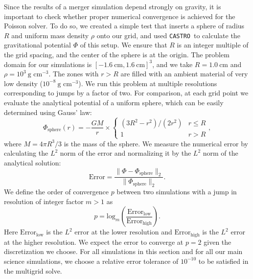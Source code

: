 \documentclass[iop]{../emulateapj}
\newcommand{\castro}{\texttt{CASTRO}}
\begin{document}
Since the results of a merger simulation depend strongly on gravity,
it is important to check whether proper numerical convergence is
achieved for the Poisson solver. To do so, we created a simple test
that inserts a sphere of radius $R$ and uniform mass density $\rho$
onto our grid, and used \castro\ to calculate the gravitational
potential $\Phi$ of this setup. We ensure that $R$ is an integer
multiple of the grid spacing, and the center of the sphere is at the
origin. The problem domain for our simulations is $[-1.6\ \text{cm}, 1.6\ \text{cm}]^3$, and
we take $R = 1.0\ \text{cm}$ and $\rho = 10^3\ \text{g cm}^{-3}$. 
The zones with $r > R$ are filled with an ambient material of very low density 
($10^{-8}\ \text{g cm}^{-3}$). We run this problem at multiple 
resolutions corresponding to jumps by a factor of two. For
comparison, at each grid point we evaluate the analytical potential of
a uniform sphere, which can be easily determined using Gauss' law:
\begin{equation}
  \Phi_{\text{sphere}}(r) = -\frac{GM}{r} \times \begin{cases} (3R^2 - r^2)/(2 r^2) & r \leq R \\ 1 & r > R \end{cases},\label{eq:sphere-analytical}
\end{equation}
where $M = 4\pi R^3 / 3$ is the mass of the sphere. We measure the 
numerical error by calculating the $L^2$ norm of the error and 
normalizing it by the $L^2$ norm of the analytical solution:
\begin{equation}
  \text{Error} = \frac{\|\Phi - \Phi_{\text{sphere}}\|_2}{\|\Phi_{\text{sphere}}\|_2}.
\end{equation}
We define the order of convergence $p$ between two simulations with a jump 
in resolution of integer factor $m > 1$ as
\begin{equation}
  p = \text{log}_{m}\left(\frac{\text{Error}_{\text{low}}}{\text{Error}_{\text{high}}}\right).
\end{equation}
Here $\text{Error}_{\text{low}}$ is the $L^2$ error at the lower resolution 
and $\text{Error}_{\text{high}}$ is the $L^2$ error at the higher resolution.
We expect the error to converge at $p = 2$ given the discretization we choose. 
For all simulations in this section and for all our main science simulations,
we choose a relative error tolerance of $10^{-10}$ to be satisfied in the multigrid solve.
\end{document}
